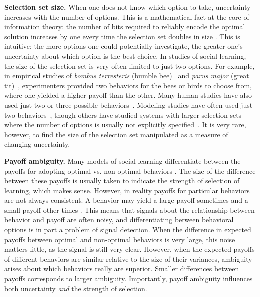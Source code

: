 \documentclass[letterpaper,11.5pt]{scrartcl}
\begin{document}
\textbf{Selection set size.}
When one does not know which option to take, uncertainty increases with the number of options. This is a mathematical fact at the core of information theory: the number of bits required to reliably encode the optimal solution increases by one every time the selection set doubles in size  \cite{mackay2003information}. 
This is intuitive; the more options one could potentially investigate, the greater one's uncertainty about which option is the best choice. In studies of social learning, the size of the selection set is very often limited to just two options. 
For example, in empirical studies of \emph{bombus terresteris} (bumble
bee)~\cite{Baracchi2018} and \emph{parus major} (great tit)~\cite{Aplin2017},
experimenters provided two behaviors for
the bees or birds to choose from, where one yielded a higher payoff than the other. %
Many human studies have also used just two
or three possible behaviors~\cite{McElreath2005,Toyokawa2019}.
Modeling studies have often used just two 
behaviors~\cite{Rogers1988,Feldman1996,Rendell2010,perreault2012bayesian}, though others have studied systems with larger selection sets where the number of options is usually not explicitly specified~\cite{boyd1995does,Enquist2007}. It is very rare, however, to find the size of the selection set manipulated as a measure of changing uncertainty. 

\textbf{Payoff ambiguity.}
Many models of social learning differentiate between the payoffs for adopting optimal vs. non-optimal behaviors \cite{Rogers1988,Enquist2007,Rendell2010}. The size of the difference between these payoffs is usually taken to indicate the strength of selection of learning, which makes sense. However, in reality payoffs for particular behaviors are not always consistent. A behavior may yield a large payoff sometimes and a small payoff other times \cite{McElreath2005}. This means that signals about the relationship between behavior and payoff are often noisy, and differentiating between behavioral options is in part a problem of signal detection.
When the difference in expected payoffs between optimal and non-optimal behaviors is very large, this noise matters little, as the signal is still very clear. However, when the expected payoffs of different behaviors are similar relative to the size of their variances, ambiguity arises about which behaviors really are superior. Smaller differences between payoffs corresponds to larger ambiguity.    
Importantly, payoff ambiguity %
influences both uncertainty \emph{and} the strength of selection. %
\end{document}
